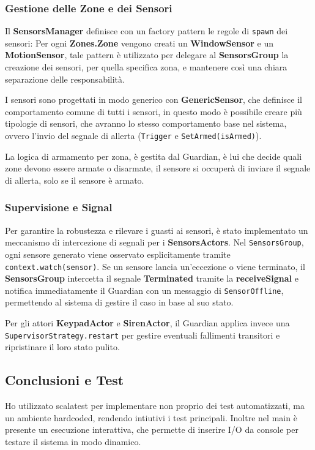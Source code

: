\subsubsection{Gestione delle Zone e dei Sensori}
Il \textbf{SensorsManager} definisce con un factory pattern le regole di \texttt{spawn} dei sensori: Per ogni \textbf{Zones.Zone} vengono creati un \textbf{WindowSensor} e un \textbf{MotionSensor}, tale pattern è utilizzato per delegare al \textbf{SensorsGroup} la creazione dei sensori, per quella specifica zona, e mantenere così una chiara separazione delle responsabilità.

I sensori sono progettati in modo generico con \textbf{GenericSensor}, che definisce il comportamento comune di tutti i sensori, in questo modo è possibile creare più tipologie di sensori, che avranno lo stesso comportamento base nel sistema, ovvero l'invio del segnale di allerta (\texttt{Trigger} e \texttt{SetArmed(isArmed)}).

La logica di armamento per zona, è gestita dal Guardian, è lui che decide quali zone devono essere armate o disarmate, il sensore si occuperà di inviare il segnale di allerta, solo se il sensore è armato.

\subsubsection{Supervisione e Signal}
Per garantire la robustezza e rilevare i guasti ai sensori, è stato implementato un meccanismo di intercezione di segnali per i \textbf{SensorsActors}. Nel \texttt{SensorsGroup}, ogni sensore generato viene osservato esplicitamente tramite \texttt{context.watch(sensor)}.
Se un sensore lancia un'eccezione o viene terminato, il \textbf{SensorsGroup} intercetta il segnale \textbf{Terminated} tramite la \textbf{receiveSignal} e notifica immediatamente il Guardian con un messaggio di \texttt{SensorOffline}, permettendo al sistema di gestire il caso in base al suo stato.

Per gli attori \textbf{KeypadActor} e \textbf{SirenActor}, il Guardian applica invece una \newline \texttt{SupervisorStrategy.restart} per gestire eventuali fallimenti transitori e ripristinare il loro stato pulito.

\subsection{Conclusioni e Test}
Ho utilizzato scalatest per implementare non proprio dei test automatizzati, ma un ambiente hardcoded, rendendo intiutivi i test principali. Inoltre nel main è presente un esecuzione interattiva, che permette di inserire I/O da console per testare il sistema in modo dinamico.